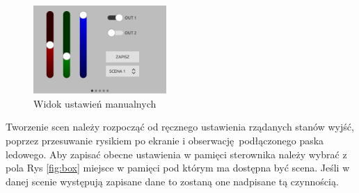 \documentclass[12pt, eng, twoside, openany, final]{mgr}
\begin{document}
            \begin{figure}[H]
            \begin{center}
                \includegraphics[width=0.45\textwidth]{ui_manualTab.jpg}
                \caption{Widok ustawień manualnych}
            \end{center}
            \end{figure}
            Tworzenie scen należy rozpocząć od ręcznego ustawienia rządanych stanów wyjść, poprzez przesuwanie rysikiem po ekranie i obserwację podłączonego paska ledowego. Aby zapisać obecne ustawienia w pamięci sterownika należy wybrać z pola Rys \ref{fig:box} miejsce w pamięci pod którym ma dostępna być scena. Jeśli w danej scenie występują zapisane dane to zostaną one nadpisane tą czynnością.
            
\end{document}
